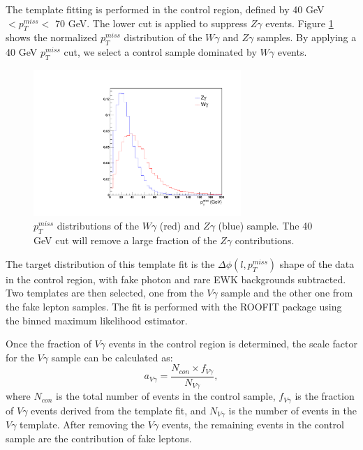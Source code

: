 \documentclass[thesis.tex]{subfiles}
\renewcommand\_{\textunderscore\allowbreak}
\begin{document}
The template fitting is performed in the control region, defined by 40 GeV $< p_{T}^{miss} <$ 70 GeV. The lower cut is applied to suppress $Z\gamma$ events. Figure \ref{fig:WGZG_met} shows the normalized $p_{T}^{miss}$ distribution of the $W\gamma$ and $Z\gamma$ samples. By applying a 40 GeV $p_{T}^{miss}$ cut, we select a control sample dominated by $W\gamma$ events.  

\begin{figure}[!hbt]
  \centering
    \includegraphics[width=0.7\textwidth]{Figures/dphiTemplate_MET.pdf}
  \caption{$p_T^{miss}$ distributions of the $W\gamma$ (red) and $Z\gamma$ (blue) sample. The 40 GeV cut will remove a large fraction of the $Z\gamma$ contributions.}
    \label{fig:WGZG_met}
\end{figure}

The target distribution of this template fit is the $\Delta\phi(l,p_{T}^{miss})$ shape of the data in the control region, with fake photon and rare EWK backgrounds subtracted. Two templates are then selected, one from the $V\gamma$ sample and the other one from the fake lepton samples. The fit is performed with the ROOFIT package using the binned maximum likelihood estimator.

Once the fraction of $V\gamma$ events in the control region is determined, the scale factor for the $V\gamma$ sample can be calculated as: 
\begin{equation}
 		a_{V\gamma} = \frac{N_{con}\times f_{V\gamma}}{N_{V\gamma}}, 
\end{equation}
where $N_{con}$ is the total number of events in the control sample, $f_{V\gamma}$ is the fraction of $V\gamma$ events derived from the template fit, and $N_{V\gamma}$ is the number of events in the $V\gamma$ template. After removing the $V\gamma$ events, the remaining events in the control sample are the contribution of fake leptons. 
\end{document}
